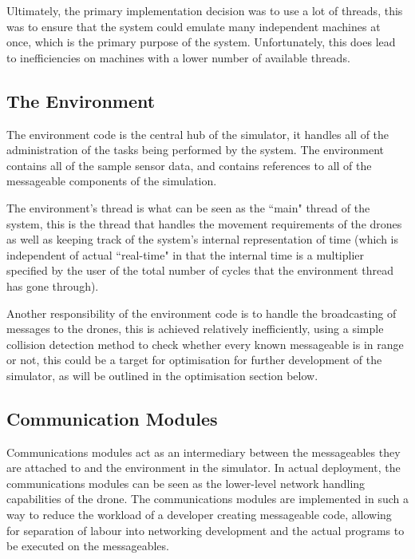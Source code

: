 	Ultimately, the primary implementation decision was to use a lot of threads, this was to ensure that
	the system could emulate many independent machines at once, which is the primary purpose of the system.
	Unfortunately, this does lead to inefficiencies on machines with a lower number of available threads.


	\subsection{The Environment}
		The environment code is the central hub of the simulator, it handles all of the administration
		of the tasks being performed by the system. The environment contains all of the sample sensor
		data, and contains references to all of the messageable components of the simulation.

		The environment's thread is what can be seen as the ``main" thread of the system, this is the
		thread that handles the movement requirements of the drones as well as keeping track of the
		system's internal representation of time (which is independent of actual ``real-time" in that
		the internal time is a multiplier specified by the user of the total number of cycles that the
		environment thread has gone through).

		Another responsibility of the environment code is to handle the broadcasting of messages to
		the drones, this is achieved relatively inefficiently, using a simple collision detection
		method to check whether every known messageable is in range or not, this could be a target
		for optimisation for further development of the simulator, as will be outlined in the optimisation
		section below.

	\subsection{Communication Modules}
		Communications modules act as an intermediary between the messageables they are attached to and
		the environment in the simulator. In actual deployment, the communications modules can be seen as
		the lower-level network handling capabilities of the drone. The communications modules are implemented
		in such a way to reduce the workload of a developer creating messageable code, allowing for separation
		of labour into networking development and the actual programs to be executed on the messageables.

